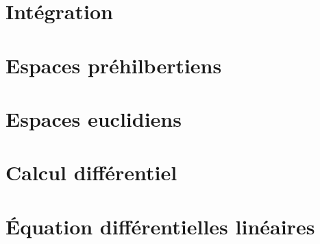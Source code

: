 \documentclass[12pt]{article}
\theoremstyle{remark}
\numberwithin{equation}{section}
\begin{document}
\section{Intégration}
\section{Espaces préhilbertiens}
\section{Espaces euclidiens}
\section{Calcul différentiel}
\section{\'Equation différentielles linéaires}
\end{document}
